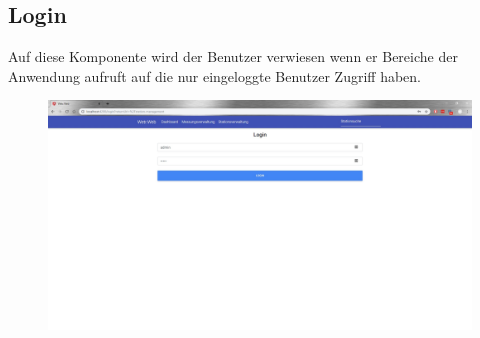 \documentclass[10pt,a4paper,margin=0pt]{scrartcl}
\begin{document}
\subsection{Login}
Auf diese Komponente wird der Benutzer verwiesen wenn er Bereiche der Anwendung aufruft auf die nur eingeloggte Benutzer Zugriff haben.
\begin{figure}[H]
	\includegraphics[width=\textwidth]{./img/login.jpg}
	\centering
\end{figure}
\end{document}
